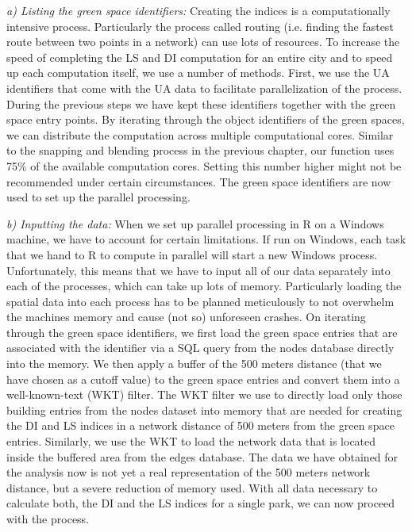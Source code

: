 \documentclass[10pt]{article}
\begin{document}
\textit{a) Listing the green space identifiers:} Creating the indices is a computationally intensive process. Particularly the process called routing (i.e. finding the fastest route between two points in a network) can use lots of resources. To increase the speed of completing the LS and DI computation for an entire city and to speed up each computation itself, we use a number of methods. First, we use the UA identifiers that come with the UA data to facilitate parallelization of the process. During the previous steps we have kept these identifiers together with the green space entry points. By iterating through the object identifiers of the green spaces, we can distribute the computation across multiple computational cores. Similar to the snapping and blending process in the previous chapter, our function uses 75\% of the available computation cores. Setting this number higher might not be recommended under certain circumstances. The green space identifiers are now used to set up the parallel processing.

\textit{b) Inputting the data:} When we set up parallel processing in R on a Windows machine, we have to account for certain limitations. If run on Windows, each task that we hand to R to compute in parallel will start a new Windows process. Unfortunately, this means that we have to input all of our data separately into each of the processes, which can take up lots of memory. Particularly loading the spatial data into each process has to be planned meticulously to not overwhelm the machines memory and cause (not so) unforeseen crashes. On iterating through the green space identifiers, we first load the green space entries that are associated with the identifier via a SQL query from the nodes database directly into the memory. We then apply a buffer of the 500 meters distance (that we have chosen as a cutoff value) to the green space entries and convert them into a well-known-text (WKT) filter. The WKT filter we use to directly load only those building entries from the nodes dataset into memory that are needed for creating the DI and LS indices in a network distance of 500 meters from the green space entries. Similarly, we use the WKT to load the network data that is located inside the buffered area from the edges database. The data we have obtained for the analysis now is not yet a real representation of the 500 meters network distance, but a severe reduction of memory used. With all data necessary to calculate both, the DI and the LS indices for a single park, we can now proceed with the process.
\end{document}
